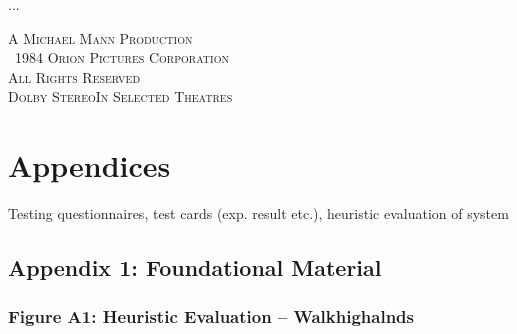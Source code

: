 \documentclass[11pt, english]{article}
\begin{document}
	...

	\vspace{\fill}

	\begin{center}
		\textsc{A Michael Mann Production}\\
		\textcopyright\ \textsc{1984 Orion Pictures Corporation}\\
		\small{\textsc{All Rights Reserved}}\\
		\small{\textsc{Dolby Stereo}\texttrademark \textsc{In Selected Theatres}}
	\end{center}

\newpage



\section*{Appendices}

	Testing questionnaires, test cards (exp. result etc.), heuristic evaluation of system

	\subsection*{Appendix 1: Foundational Material}

		\subsubsection*{Figure A1: Heuristic Evaluation -- Walkhighalnds}
\end{document}

